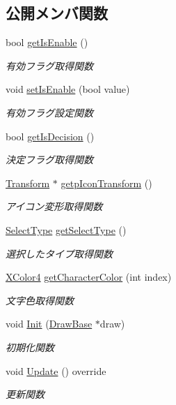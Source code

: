 \subsection*{公開メンバ関数}
\begin{DoxyCompactItemize}
\item 
bool \mbox{\hyperlink{class_pause_ad0dfae63dc2370deb96d5fde4fffe1df}{get\+Is\+Enable}} ()
\begin{DoxyCompactList}\small\item\em 有効フラグ取得関数 \end{DoxyCompactList}\item 
void \mbox{\hyperlink{class_pause_abdc2f8eb5a953b807d95b15529b82ac1}{set\+Is\+Enable}} (bool value)
\begin{DoxyCompactList}\small\item\em 有効フラグ設定関数 \end{DoxyCompactList}\item 
bool \mbox{\hyperlink{class_pause_a31d255e4ec7bd216ec0eb5f3fc14dcac}{get\+Is\+Decision}} ()
\begin{DoxyCompactList}\small\item\em 決定フラグ取得関数 \end{DoxyCompactList}\item 
\mbox{\hyperlink{class_transform}{Transform}} $\ast$ \mbox{\hyperlink{class_pause_af6f43901ddcf224b3915e0248effce17}{getp\+Icon\+Transform}} ()
\begin{DoxyCompactList}\small\item\em アイコン変形取得関数 \end{DoxyCompactList}\item 
\mbox{\hyperlink{class_pause_a13a552c560a41cf0b17cbef35f8fece7}{Select\+Type}} \mbox{\hyperlink{class_pause_a0c6bf0b0e82e2beace53808e3d08d45f}{get\+Select\+Type}} ()
\begin{DoxyCompactList}\small\item\em 選択したタイプ取得関数 \end{DoxyCompactList}\item 
\mbox{\hyperlink{_vector3_d_8h_a680c30c4a07d86fe763c7e01169cd6cc}{X\+Color4}} \mbox{\hyperlink{class_pause_afd41b36ed24525fffa4acabde09eaa18}{get\+Character\+Color}} (int index)
\begin{DoxyCompactList}\small\item\em 文字色取得関数 \end{DoxyCompactList}\item 
void \mbox{\hyperlink{class_pause_a0986aa6eb5fcf9375408b47150d6f611}{Init}} (\mbox{\hyperlink{class_draw_base}{Draw\+Base}} $\ast$draw)
\begin{DoxyCompactList}\small\item\em 初期化関数 \end{DoxyCompactList}\item 
void \mbox{\hyperlink{class_pause_aeb1d068bcff8e32feea81945e2202141}{Update}} () override
\begin{DoxyCompactList}\small\item\em 更新関数 \end{DoxyCompactList}\end{DoxyCompactItemize}
